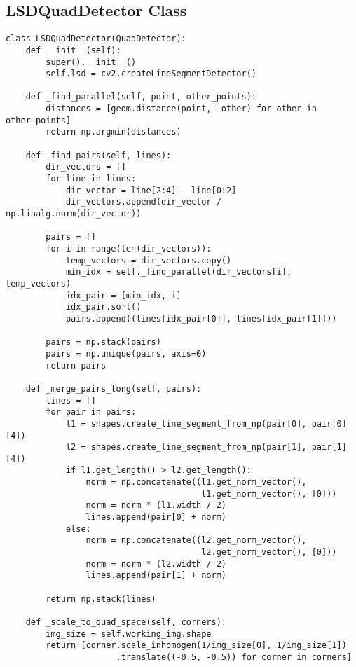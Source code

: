 \subsection{LSDQuadDetector Class}

\begin{verbatim}
class LSDQuadDetector(QuadDetector):
    def __init__(self):
        super().__init__()
        self.lsd = cv2.createLineSegmentDetector()
    
    def _find_parallel(self, point, other_points):
        distances = [geom.distance(point, -other) for other in other_points]
        return np.argmin(distances)
    
    def _find_pairs(self, lines):
        dir_vectors = []
        for line in lines:
            dir_vector = line[2:4] - line[0:2]
            dir_vectors.append(dir_vector / np.linalg.norm(dir_vector))
    
        pairs = []
        for i in range(len(dir_vectors)):
            temp_vectors = dir_vectors.copy()
            min_idx = self._find_parallel(dir_vectors[i], temp_vectors)
            idx_pair = [min_idx, i]
            idx_pair.sort()
            pairs.append((lines[idx_pair[0]], lines[idx_pair[1]]))
        
        pairs = np.stack(pairs)
        pairs = np.unique(pairs, axis=0)
        return pairs
    
    def _merge_pairs_long(self, pairs):
        lines = []
        for pair in pairs:
            l1 = shapes.create_line_segment_from_np(pair[0], pair[0][4])
            l2 = shapes.create_line_segment_from_np(pair[1], pair[1][4])
            if l1.get_length() > l2.get_length():
                norm = np.concatenate((l1.get_norm_vector(), 
                                       l1.get_norm_vector(), [0]))
                norm = norm * (l1.width / 2)
                lines.append(pair[0] + norm)
            else:
                norm = np.concatenate((l2.get_norm_vector(), 
                                       l2.get_norm_vector(), [0]))
                norm = norm * (l2.width / 2)
                lines.append(pair[1] + norm)
        
        return np.stack(lines)
    
    def _scale_to_quad_space(self, corners):
        img_size = self.working_img.shape
        return [corner.scale_inhomogen(1/img_size[0], 1/img_size[1])
                      .translate((-0.5, -0.5)) for corner in corners]
    

\end{verbatim}
